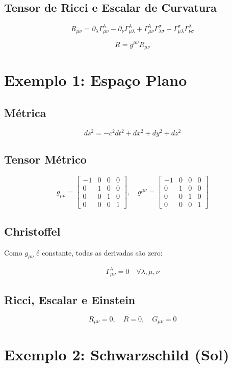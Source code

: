 \documentclass[12pt]{article}
\begin{document}
\subsection{Tensor de Ricci e Escalar de Curvatura}
\[
R_{\mu\nu} = \partial_\lambda \Gamma^\lambda_{\mu\nu} - \partial_\nu \Gamma^\lambda_{\mu\lambda} + \Gamma^\lambda_{\mu\nu} \Gamma^\sigma_{\lambda\sigma} - \Gamma^\sigma_{\mu\lambda} \Gamma^\lambda_{\nu\sigma}
\]

\[
R = g^{\mu\nu} R_{\mu\nu}
\]

\section{Exemplo 1: Espaço Plano}
\subsection{Métrica}
\[
ds^2 = -c^2 dt^2 + dx^2 + dy^2 + dz^2
\]

\subsection{Tensor Métrico}
\[
g_{\mu\nu} =
\begin{bmatrix}
-1 & 0 & 0 & 0\\
0 & 1 & 0 & 0\\
0 & 0 & 1 & 0\\
0 & 0 & 0 & 1
\end{bmatrix}, \quad
g^{\mu\nu} =
\begin{bmatrix}
-1 & 0 & 0 & 0\\
0 & 1 & 0 & 0\\
0 & 0 & 1 & 0\\
0 & 0 & 0 & 1
\end{bmatrix}
\]

\subsection{Christoffel}
Como $g_{\mu\nu}$ é constante, todas as derivadas são zero:

\[
\Gamma^\lambda_{\mu\nu} = 0 \quad \forall \lambda,\mu,\nu
\]

\subsection{Ricci, Escalar e Einstein}
\[
R_{\mu\nu} = 0, \quad R=0, \quad G_{\mu\nu}=0
\]

\section{Exemplo 2: Schwarzschild (Sol)}
\end{document}
